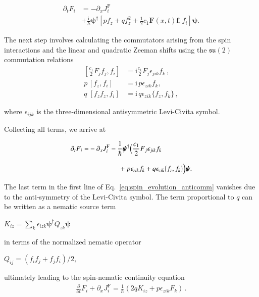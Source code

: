 \documentclass[aps,

               pra,
               twocolumn,
               amsmath,
               amssymb,
               superscriptaddress,
               reprint,
               10pt
              ]{revtex4-2}
\begin{document}
\begin{appendix}
\begin{align}
     \partial_t F_i &=  -\partial_x {J}^\mathrm{F}_i \nonumber \\ &+ \frac{\mathrm{i}}{\hbar} \boldsymbol{\psi}^{\dagger} \left[pf_z+qf_z^2+\frac{1}{2}c_1\boldsymbol{F}(x,t)\boldsymbol{f}, f_i\right] \boldsymbol{\psi}.
\end{align}

The next step involves calculating the commutators arising from the spin interactions and the linear and quadratic Zeeman shifts using the $\mathfrak{su}(2)$ commutation relations \\

\begin{align}
    \left[\frac{c_1}{2}F_j f_j, f_i\right] &= \mathrm{i} \frac{c_1}{2}F_j  \epsilon_{jik} f_k\, , \\[0.2cm]
    p \, [f_z, f_i] &=  \mathrm{i} \, p \epsilon_{zik} f_k, \, \\[0.25cm]
    q \; [f_zf_z, f_i] &= \mathrm{i} \, q \epsilon_{zik} \{f_z, f_k\}\, , \label{eq:Nematic_qpart}
\end{align}

where $\epsilon_{ijk}$ is the three-dimensional antisymmetric Levi-Civita symbol.

Collecting all terms, we arrive at

\begin{align}
    \partial_t F_i = &-\partial_x {J}^\mathrm{F}_i
    - \frac{1}{\hbar}\boldsymbol{\psi}^{\dagger}\Big(\frac{c_1}{2}F_j \epsilon_{jik} f_k  \nonumber \\[0.25cm]
    &\hspace*{1.5cm}+ p \epsilon_{zik} f_k + q\epsilon_{zik}\{f_z, f_k\}\Big)\boldsymbol{\psi}. \label{eq:spin_evolution_anticomm}
\end{align}


The last term in the first line of Eq.~\eqref{eq:spin_evolution_anticomm} vanishes due to the anti-symmetry of the Levi-Civita symbol. The term proportional to $q$ can be written as a nematic source term

$K_{iz} = \sum_k \epsilon_{izk} \boldsymbol{\psi}^{\dagger} Q_{zk} \boldsymbol{\psi}$

in terms of the normalized nematic operator

$Q_{ij} = (f_if_j + f_jf_i)/2$,

ultimately leading to the spin-nematic continuity equation
\begin{align}
    \frac{\partial}{\partial t} F_i + \partial_x {J}_i^\mathrm{F} = \frac{1}{\hbar} \left(2qK_{iz} + p\epsilon_{zik} F_k \right)\, .
    \label{eq:Spin-Nematic-continuity}
\end{align}






\end{appendix}
\end{document}
